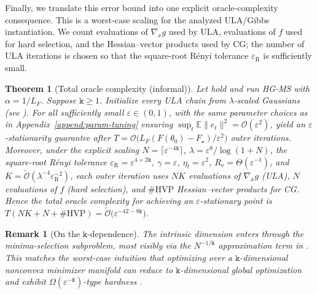 \documentclass{article}
\theoremstyle{normaltheorem}
\newtheorem{theorem}{Theorem}[section]
\newtheorem{remark}[remark]{Remark}
\newcommand{\dimk}{\texttt{k}}
\begin{document}
Finally, we translate this error bound into one explicit oracle-complexity consequence. This is a worst-case
scaling for the analyzed ULA/Gibbs instantiation. We count evaluations of \(\nabla_x g\) used by ULA, evaluations of \(f\) used for hard selection,
and the Hessian--vector products used by CG; the number of ULA iterations is chosen so that the square-root R\'enyi
tolerance \(\varepsilon_{\mathrm R}\) is sufficiently small. 

\begin{theorem}[Total oracle complexity (informal)]\label{corr:oracle-complexity}
Let  hold and run \textsc{HG-MS} with $\alpha=1/L_F$.
Suppose \(\dimk\ge 1\).
Initialize every ULA chain from \(\lambda\)-scaled Gaussians (see ).
For all sufficiently small \(\varepsilon\in(0,1)\), with the same parameter choices as in  Appendix~\ref{append:param-tuning} ensuring $\sup_t\mathbb E\|e_t\|^2=\mathcal{O}(\varepsilon^2)$,
 yield an $\varepsilon$-stationarity guarantee after
$T=\mathcal{O}\big(L_F(F(\theta_0)-F_\star)/\varepsilon^2\big)$ outer iterations.
Moreover, under the explicit scaling $N=\lceil\varepsilon^{-4\dimk}\rceil$, $\lambda=\varepsilon^{8}/\log(1+N)$,
the square-root R\'enyi tolerance $\varepsilon_{\mathrm{R}}=\varepsilon^{4+2\dimk}$, \(\gamma=\varepsilon\), \(\eta_t=\varepsilon^2\), \(R_v=\Theta(\varepsilon^{-1})\), and
$K=\widetilde{\mathcal{O}}(\lambda^{-4}\varepsilon_{\mathrm{R}}^{-2})$,
each outer iteration uses $NK$ evaluations of $\nabla_x g$ (ULA), $N$ evaluations of $f$ (hard selection), and \(\#\mathrm{HVP}\) Hessian--vector products for CG.
Hence the total oracle complexity for achieving an $\varepsilon$-stationary point is
\(
T(NK+N+\#\mathrm{HVP})
=
\widetilde{\mathcal{O}}\Big(\varepsilon^{-42-8\dimk}\Big).
\)
\end{theorem}

\begin{remark}[{On the \texorpdfstring{$\dimk$}{k}-dependence}]\label{rem:k-dependence}
The intrinsic dimension enters through the minima-selection subproblem, most visibly via the \(N^{-1/\dimk}\) approximation term in .
This matches the worst-case intuition that optimizing over a \(\dimk\)-dimensional nonconvex minimizer manifold can reduce to \(\dimk\)-dimensional global optimization and exhibit \(\Omega(\varepsilon^{-\dimk})\)-type hardness \citep[Rem.~1.1]{masiha2025superquantile}.
\end{remark}
\end{document}

